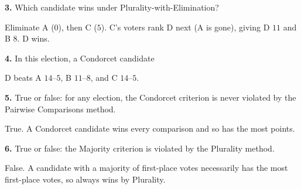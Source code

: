 \documentclass[12pt]{ximera}
\begin{document}
\begin{problem}
\begin{prompt}
\textbf{3.} Which candidate wins under Plurality-with-Elimination?

\begin{multipleChoice}
\end{multipleChoice}

\begin{feedback}
Eliminate A ($0$), then C ($5$). C's voters rank D next (A is gone), giving D $11$ and
B $8$. D wins.
\end{feedback}
\end{prompt}

\begin{prompt}
\textbf{4.} In this election, a Condorcet candidate

\begin{multipleChoice}
\end{multipleChoice}

\begin{feedback}
D beats A $14$--$5$, B $11$--$8$, and C $14$--$5$.
\end{feedback}
\end{prompt}
\end{problem}

\begin{problem}
\textbf{5.} True or false: for any election, the Condorcet criterion is never violated by
the Pairwise Comparisons method.

\begin{multipleChoice}
\end{multipleChoice}

\begin{feedback}
True. A Condorcet candidate wins every comparison and so has the most points.
\end{feedback}
\end{problem}

\begin{problem}
\textbf{6.} True or false: the Majority criterion is violated by the Plurality method.

\begin{multipleChoice}
\end{multipleChoice}

\begin{feedback}
False. A candidate with a majority of first-place votes necessarily has the most
first-place votes, so always wins by Plurality.
\end{feedback}
\end{problem}
\end{document}
